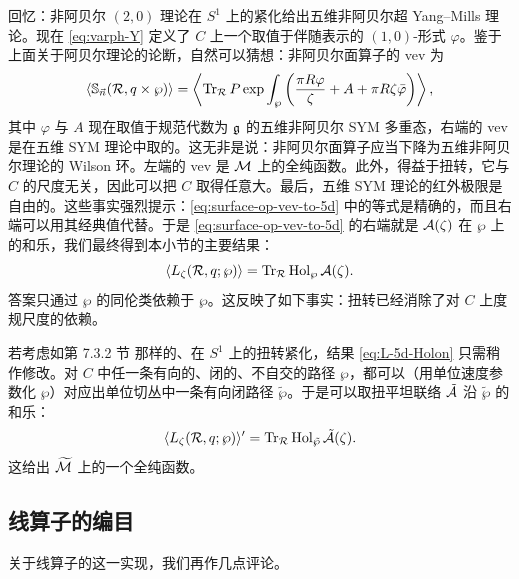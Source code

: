 回忆：非阿贝尔 $(2,0)$ 理论在 $S^1$ 上的紧化给出五维非阿贝尔超 Yang--Mills 理论。现在 \eqref{eq:varph-Y} 定义了 $C$ 上一个取值于伴随表示的 $(1,0)$-形式 $\varphi$。鉴于上面关于阿贝尔理论的论断，自然可以猜想：非阿贝尔面算子的 vev 为
\begin{equation}\label{eq:surface-op-vev-to-5d}
\left\langle {\mathbb S}_{\vec n}(\mathcal{R}, q\times \wp) \right\rangle = \left\langle \operatorname{Tr}_{\mathcal{R}} P \exp \int_\wp \left( \frac{\pi R \varphi}{\zeta} + A + \pi R \zeta \bar \varphi \right) \right\rangle,
\end{equation}
其中 $\varphi$ 与 $A$ 现在取值于规范代数为 $\mathfrak{g}$ 的五维非阿贝尔 SYM 多重态，右端的 vev 是在五维 SYM 理论中取的。这无非是说：非阿贝尔面算子应当下降为五维非阿贝尔理论的 Wilson 环。左端的 vev 是 $\mathcal{M}$ 上的全纯函数。此外，得益于扭转，它与 $C$ 的尺度无关，因此可以把 $C$ 取得任意大。最后，五维 SYM 理论的红外极限是自由的。这些事实强烈提示：\eqref{eq:surface-op-vev-to-5d} 中的等式是精确的，而且右端可以用其经典值代替。于是 \eqref{eq:surface-op-vev-to-5d} 的右端就是 $\mathcal{A}(\zeta)$ 在 $\wp$ 上的和乐，我们最终得到本小节的主要结果：
\begin{equation}\label{eq:L-5d-Holon}
\langle L_\zeta(\mathcal{R},q;\wp) \rangle = \operatorname{Tr}_{\mathcal{R}} \operatorname{Hol}_\wp \mathcal{A}(\zeta).
\end{equation}
答案只通过 $\wp$ 的同伦类依赖于 $\wp$。这反映了如下事实：扭转已经消除了对 $C$ 上度规尺度的依赖。

若考虑如第 7.3.2 节%
那样的、在 $S^1$ 上的扭转紧化，结果 \eqref{eq:L-5d-Holon} 只需稍作修改。对 $C$ 中任一条有向的、闭的、不自交的路径 $\wp$，都可以（用单位速度参数化 $\wp$）对应出单位切丛中一条有向闭路径 $\tilde\wp$。于是可以取扭平坦联络 $\tilde{\mathcal{A}}$ 沿 $\tilde\wp$ 的和乐：
\begin{equation}\label{eq:L-5d-Holon-twisted}
\langle L_\zeta(\mathcal{R},q;\wp) \rangle' = \operatorname{Tr}_{\mathcal{R}} \operatorname{Hol}_{\tilde\wp} \tilde{\mathcal{A}}(\zeta).
\end{equation}
这给出 $\widetilde{\cal M}$ 上的一个全纯函数。

\subsection{线算子的编目}

关于线算子的这一实现，我们再作几点评论。

